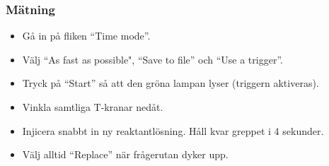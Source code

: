 \subsubsection{Mätning}
\begin{itemize}
\item Gå in på fliken ``Time mode''.
\item Välj ``As fast as possible", ``Save to file'' och ``Use a trigger''.
\item Tryck på ``Start'' så att den gröna lampan lyser (triggern aktiveras).
\item Vinkla samtliga T-kranar nedåt.
\item Injicera snabbt in ny reaktantlösning. Håll kvar greppet i 4 sekunder.
\item Välj alltid ``Replace'' när frågerutan dyker upp.
\end{itemize}

